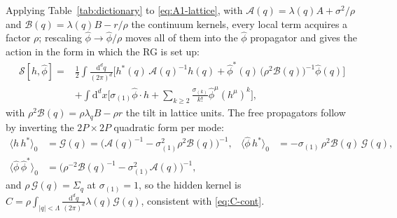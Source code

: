 \documentclass[11pt,a4paper]{article}
\newcommand{\Sact}{\mathcal S}
\newcommand{\dd}{\mathrm d}
\newcommand{\Lam}{\Lambda}
\begin{document}
Applying Table~\ref{tab:dictionary} to \eqref{eq:A1-lattice}, with $\mathcal A(q) = \lambda(q)A+\sigma^2/\rho$ and $\mathcal B(q) = \lambda(q)B - r/\rho$ the continuum kernels, every local term acquires a factor $\rho$; rescaling $\hat\phi\to\hat\phi/\rho$ moves all of them into the $\hat\phi$ propagator and gives the action in the form in which the RG is set up:
\begin{equation}
\begin{aligned}
  \Sact[h,\hat\phi] = {}&\frac12\int\frac{\dd^dq}{(2\pi)^d}\Big[h^{*}(q)\,\mathcal A(q)^{-1}h(q) + \hat\phi^{*}(q)\,\big(\rho^2\mathcal B(q)\big)^{-1}\hat\phi(q)\Big]\\
  &+ \int\dd^dx\Big[\sigma_{(1)}\hat\phi\cdot h + \sum_{k\ge2}\frac{\sigma_{(k)}}{k!}\hat\phi^{\mu}(h^{\mu})^k\Big],
\end{aligned}
  \label{eq:S-cont}
\end{equation}
with $\rho^2\mathcal B(q) = \rho\lambda_qB - \rho r$ the tilt in lattice units. The free propagators follow by inverting the $2P\times2P$ quadratic form per mode:
\begin{equation}
\begin{aligned}
  \langle h\,h^{*}\rangle_0 &= \mathcal G(q) = \big(\mathcal A(q)^{-1} - \sigma_{(1)}^2\rho^2\mathcal B(q)\big)^{-1}, &
  \langle\hat\phi\,h^{*}\rangle_0 &= -\sigma_{(1)}\,\rho^2\mathcal B(q)\,\mathcal G(q),\\
  \langle\hat\phi\,\hat\phi^{*}\rangle_0 &= \big(\rho^{-2}\mathcal B(q)^{-1} - \sigma_{(1)}^2\mathcal A(q)\big)^{-1},
\end{aligned}
\end{equation}
and $\rho\,\mathcal G(q) = \Sigma_q$ at $\sigma_{(1)} = 1$, so the hidden kernel is $C = \rho\int_{|q|<\Lam}\frac{\dd^dq}{(2\pi)^d}\lambda(q)\mathcal G(q)$, consistent with \eqref{eq:C-cont}.
\end{document}
